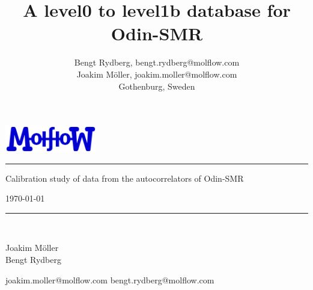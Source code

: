 \documentclass[12pt]{article}
\begin{document}
\fancyhead[CE,CO]{}
\fancyhead[RE,RO]{}
\fancyfoot[LO,LE]{}
\fancyfoot[RO,RE]{}
\fancyfoot[CO,CE]{\thepage}
\renewcommand{\footrulewidth}{0.4pt}
\renewcommand{\headrulewidth}{0.4pt}




\title{A level0 to level1b database for Odin-SMR\\
       \vspace*{85mm}}
\author{
        Bengt Rydberg, bengt.rydberg@molflow.com\\
        Joakim M\"{o}ller, joakim.moller@molflow.com\\
        Gothenburg, Sweden\\
        }

\begin{titlepage}
            \includegraphics[width=0.3\textwidth]{molflow.png}
  \begin{flushright}
    \noindent\rule{\textwidth}{2pt}
    \vspace{1cm}
    \begin{huge}
      Calibration study of data from the  autocorrelators of Odin-SMR\\
    \end{huge}
      \vspace{1cm}
   \today\\
    \noindent\rule{\textwidth}{2pt}
    \vspace{1cm}\\
    \begin{minipage}[t]{0.3\textwidth}
    \end{minipage}%
    \begin{minipage}[t]{0.30\textwidth}
        Joakim M\"{o}ller\\
        Bengt Rydberg
    \end{minipage}%
    \begin{minipage}[t]{0.4\textwidth}
      \begin{flushright}
        joakim.moller@molflow.com
        bengt.rydberg@molflow.com
      \end{flushright}
\end{minipage}
  \vspace{8cm}
\end{flushright}
\end{titlepage}
\end{document}

